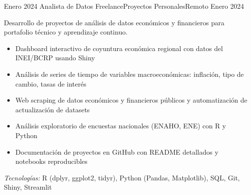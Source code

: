 \experience
{Enero 2024} {Analista de Datos Freelance}{Proyectos Personales}{Remoto}
{Enero 2024} {
	Desarrollo de proyectos de análisis de datos económicos y financieros para portafolio técnico y aprendizaje continuo.
	\begin{itemize}
		\item Dashboard interactivo de coyuntura económica regional con datos del INEI/BCRP usando Shiny
		\item Análisis de series de tiempo de variables macroeconómicas: inflación, tipo de cambio, tasas de interés
		\item Web scraping de datos económicos y financieros públicos y automatización de actualización de datasets
		\item Análisis exploratorio de encuestas nacionales (ENAHO, ENE) con R y Python
		\item Documentación de proyectos en GitHub con README detallados y notebooks reproducibles
	\end{itemize}
}
{\footnotesize{\emph{Tecnologías:} R (dplyr, ggplot2, tidyr), Python (Pandas, Matplotlib), SQL, Git, Shiny, Streamlit}}
